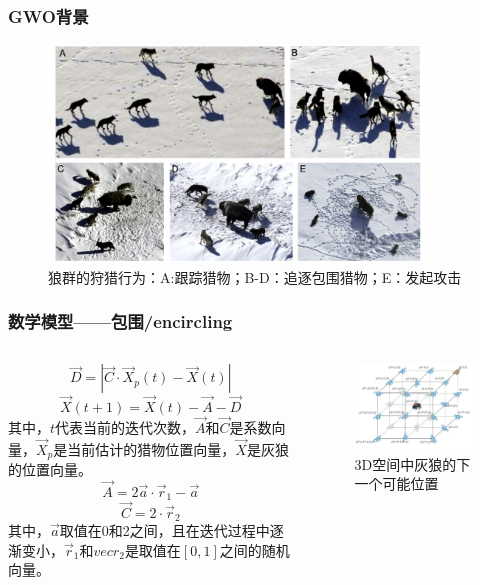 \begin{frame}
	\frametitle{GWO背景}
		\begin{figure}[htbp]
			\centering
			\includegraphics[width=10cm]{pic/wolf2.png}
			\caption{狼群的狩猎行为：A:跟踪猎物；B-D：追逐包围猎物；E：发起攻击}
		\end{figure}
\end{frame}


\begin{frame}
	\frametitle{数学模型——包围/encircling}
	\begin{columns}
		\begin{equation}
			\vec{D}=|\vec{C} \cdot \vec{X}_{p}(t)-\vec{X}(t)|
		\end{equation}
		\begin{equation}
		\vec{X}(t+1)=\vec{X}(t)-\vec{A}-\vec{D}
		\end{equation}
		其中，$t$代表当前的迭代次数，$\vec{A}$和$\vec{C}$是系数向量，$\vec{X}_p$是当前估计的猎物位置向量，$\vec{X}$是灰狼的位置向量。
		\begin{equation}
			\vec{A}=2\vec{a} \cdot \vec{r}_{1}-\vec{a}
		\end{equation}
		\begin{equation}
		\vec{C}=2 \cdot \vec{r}_2
		\end{equation}
		其中，$\vec{a}$取值在0和2之间，且在迭代过程中逐渐变小，$\vec{r}_1$和$vec{r}_2$是取值在$[0,1]$之间的随机向量。
		\begin{figure}[htbp]
			\centering
			\includegraphics[width=7cm]{pic/wolf3.png}
			\caption{3D空间中灰狼的下一个可能位置}
		\end{figure}
	\end{columns}
\end{frame}


